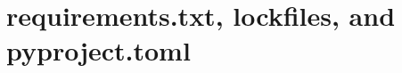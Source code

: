 \chapter{requirements.txt, lockfiles, and pyproject.toml}
\label{ch:requirements-txt-lockfiles-and}

